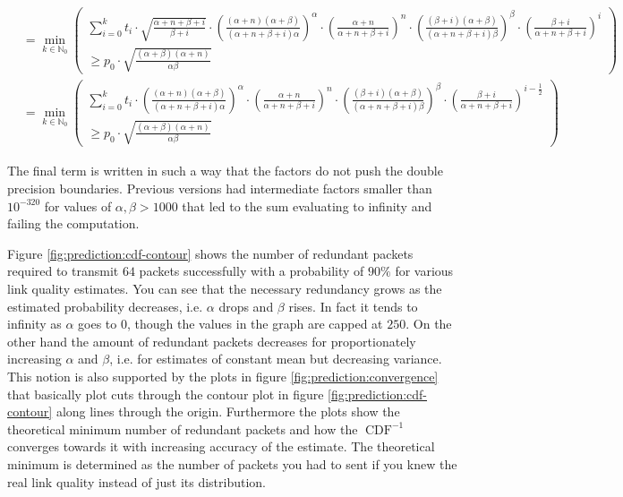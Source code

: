 \documentclass[10pt,a4paper]{article}
\DeclareMathOperator{\cdf}{CDF}
\begin{document}
\begin{align*}
                      & = \min_{k \in \mathbb{N}_{0}} \left( \begin{array}{r} \sum_{i = 0}^{k} t_{i} \cdot \sqrt{\frac{\alpha + n + \beta + i}{\beta + i}} \cdot \left( \frac{(\alpha + n)(\alpha + \beta)}{(\alpha + n + \beta + i)\alpha} \right)^{\alpha} \cdot \left( \frac{\alpha + n}{\alpha + n + \beta + i} \right)^{n} \cdot \left( \frac{(\beta + i)(\alpha + \beta)}{(\alpha + n + \beta + i)\beta} \right)^{\beta} \cdot \left( \frac{\beta + i}{\alpha + n + \beta + i} \right)^{i}\\ \ge p_{0} \cdot \sqrt{\frac{(\alpha + \beta)(\alpha + n)}{\alpha\beta}} \end{array} \right)\\
                      & = \min_{k \in \mathbb{N}_{0}} \left( \begin{array}{r} \sum_{i = 0}^{k} t_{i} \cdot \left( \frac{(\alpha + n)(\alpha + \beta)}{(\alpha + n + \beta + i)\alpha} \right)^{\alpha} \cdot \left( \frac{\alpha + n}{\alpha + n + \beta + i} \right)^{n} \cdot \left( \frac{(\beta + i)(\alpha + \beta)}{(\alpha + n + \beta + i)\beta} \right)^{\beta} \cdot \left( \frac{\beta + i}{\alpha + n + \beta + i} \right)^{i - \frac{1}{2}}\\ \ge p_{0} \cdot \sqrt{\frac{(\alpha + \beta)(\alpha + n)}{\alpha\beta}} \end{array} \right)
\end{align*}

The final term is written in such a way that the factors do not push the double precision boundaries.
Previous versions had intermediate factors smaller than $10^{-320}$ for values of $\alpha, \beta > 1000$ that led to the sum evaluating to infinity and failing the computation.

Figure \ref{fig:prediction:cdf-contour} shows the number of redundant packets required to transmit $64$ packets successfully with a probability of $90\%$ for various link quality estimates.
You can see that the necessary redundancy grows as the estimated probability decreases, i.e. $\alpha$ drops and $\beta$ rises.
In fact it tends to infinity as $\alpha$ goes to $0$, though the values in the graph are capped at $250$.
On the other hand the amount of redundant packets decreases for proportionately increasing $\alpha$ and $\beta$, i.e. for estimates of constant mean but decreasing variance.
This notion is also supported by the plots in figure \ref{fig:prediction:convergence} that basically plot cuts through the contour plot in figure \ref{fig:prediction:cdf-contour} along lines through the origin.
Furthermore the plots show the theoretical minimum number of redundant packets and how the $\cdf^{-1}$ converges towards it with increasing accuracy of the estimate.
The theoretical minimum is determined as the number of packets you had to sent if you knew the real link quality instead of just its distribution.
\end{document}
